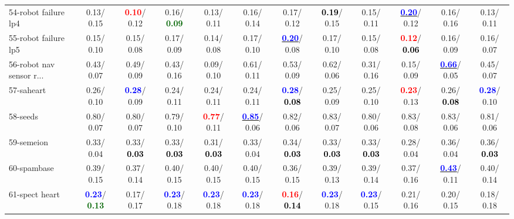 \begin{table}[h]
\begin{center}
{\begin{tabular}{lc|c|c|c|c|c|c|c|c|c|c}
54-robot failure lp4 &   0.13/  0.15 & \textcolor{red}{\textbf{  0.10}}/  0.12 &   0.16/\textcolor{darkgreen}{\textbf{  0.09}} &   0.13/  0.11 &   0.16/  0.14 &   0.17/  0.12 & \textcolor{black}{\textbf{  0.19}}/  0.15 &   0.15/  0.11 & \underline{\textcolor{blue}{\textbf{  0.20}}}/  0.12 &   0.16/  0.16 &   0.13/  0.11 \\
55-robot failure lp5 &   0.15/  0.10 &   0.15/  0.08 &   0.17/  0.09 &   0.14/  0.08 &   0.17/  0.10 & \underline{\textcolor{blue}{\textbf{  0.20}}}/  0.08 &   0.17/  0.10 &   0.15/  0.08 & \textcolor{red}{\textbf{  0.12}}/\textcolor{black}{\textbf{  0.06}} &   0.16/  0.09 &   0.16/  0.07 \\
56-robot nav sensor r... &   0.43/  0.07 &   0.49/  0.09 &   0.43/  0.16 &   0.09/  0.10 &   0.61/  0.11 &   0.53/  0.09 &   0.62/  0.06 &   0.31/  0.16 &   0.15/  0.09 & \underline{\textcolor{blue}{\textbf{  0.66}}}/  0.05 &   0.45/  0.07 \\
57-saheart &   0.26/  0.10 & \textcolor{blue}{\textbf{  0.28}}/  0.09 &   0.24/  0.11 &   0.24/  0.11 &   0.24/  0.11 & \textcolor{blue}{\textbf{  0.28}}/\textcolor{black}{\textbf{  0.08}} &   0.25/  0.09 &   0.25/  0.10 & \textcolor{red}{\textbf{  0.23}}/  0.13 &   0.26/\textcolor{black}{\textbf{  0.08}} & \textcolor{blue}{\textbf{  0.28}}/  0.10 \\
58-seeds &   0.80/  0.07 &   0.80/  0.07 &   0.79/  0.10 & \textcolor{red}{\textbf{  0.77}}/  0.11 & \underline{\textcolor{blue}{\textbf{  0.85}}}/  0.06 &   0.82/  0.06 &   0.83/  0.07 &   0.80/  0.06 &   0.83/  0.08 &   0.83/  0.06 &   0.81/  0.06 \\
59-semeion &   0.33/  0.04 &   0.33/\textcolor{black}{\textbf{  0.03}} &   0.33/\textcolor{black}{\textbf{  0.03}} &   0.31/\textcolor{black}{\textbf{  0.03}} &   0.33/  0.04 &   0.34/\textcolor{black}{\textbf{  0.03}} &   0.33/\textcolor{black}{\textbf{  0.03}} &   0.33/\textcolor{black}{\textbf{  0.03}} &   0.28/  0.04 &   0.36/  0.04 &   0.36/\textcolor{black}{\textbf{  0.03}} \\
60-spambase &   0.39/  0.15 &   0.37/  0.14 &   0.40/  0.15 &   0.40/  0.15 &   0.40/  0.15 &   0.36/  0.15 &   0.39/  0.13 &   0.39/  0.14 &   0.37/  0.16 & \underline{\textcolor{blue}{\textbf{  0.43}}}/  0.11 &   0.40/  0.14 \\ \hline
61-spect heart & \textcolor{blue}{\textbf{  0.23}}/\textcolor{darkgreen}{\textbf{  0.13}} &   0.17/  0.17 & \textcolor{blue}{\textbf{  0.23}}/  0.18 & \textcolor{blue}{\textbf{  0.23}}/  0.18 & \textcolor{blue}{\textbf{  0.23}}/  0.18 & \textcolor{red}{\textbf{  0.16}}/\textcolor{black}{\textbf{  0.14}} & \textcolor{blue}{\textbf{  0.23}}/  0.18 & \textcolor{blue}{\textbf{  0.23}}/  0.15 &   0.21/  0.16 &   0.20/  0.15 &   0.18/  0.18 \\

\end{tabular}}
\end{center}
\end{table}
